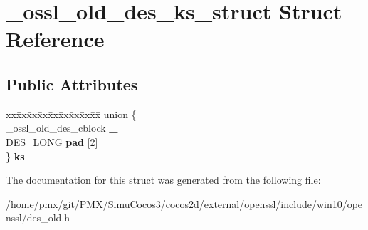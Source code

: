 \hypertarget{struct__ossl__old__des__ks__struct}{}\section{\+\_\+ossl\+\_\+old\+\_\+des\+\_\+ks\+\_\+struct Struct Reference}
\label{struct__ossl__old__des__ks__struct}
\subsection*{Public Attributes}
\begin{DoxyCompactItemize}
\item 
\mbox{\label{struct__ossl__old__des__ks__struct_a727f247111c9cf8e90fb586b13b7a261}} 
\begin{tabbing}
xx\=xx\=xx\=xx\=xx\=xx\=xx\=xx\=xx\=\kill
union \{\\
\>\_ossl\_old\_des\_cblock {\bfseries \_}\\
\>DES\_LONG {\bfseries pad} \mbox{[}2\mbox{]}\\
\} {\bfseries ks}\\

\end{tabbing}\end{DoxyCompactItemize}


The documentation for this struct was generated from the following file\+:\begin{DoxyCompactItemize}
\item 
/home/pmx/git/\+P\+M\+X/\+Simu\+Cocos3/cocos2d/external/openssl/include/win10/openssl/des\+\_\+old.\+h\end{DoxyCompactItemize}

